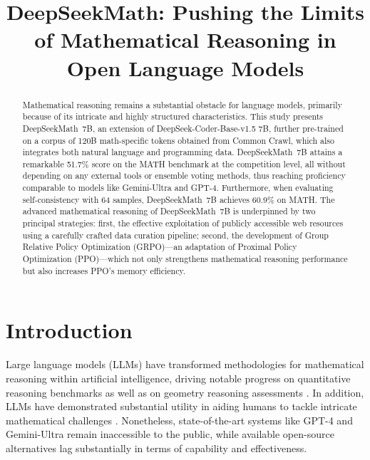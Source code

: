 \title{DeepSeekMath: Pushing the Limits of Mathematical Reasoning in Open Language Models}

\begin{abstract}
Mathematical reasoning remains a substantial obstacle for language models, primarily because of its intricate and highly structured characteristics. This study presents DeepSeekMath~7B, an extension of DeepSeek-Coder-Base-v1.5 7B, further pre-trained on a corpus of 120B math-specific tokens obtained from Common Crawl, which also integrates both natural language and programming data. DeepSeekMath~7B attains a remarkable 51.7\% score on the MATH benchmark at the competition level, all without depending on any external tools or ensemble voting methods, thus reaching proficiency comparable to models like Gemini-Ultra and GPT-4. Furthermore, when evaluating self-consistency with 64 samples, DeepSeekMath~7B achieves 60.9\% on MATH. The advanced mathematical reasoning of DeepSeekMath~7B is underpinned by two principal strategies: first, the effective exploitation of publicly accessible web resources using a carefully crafted data curation pipeline; second, the development of Group Relative Policy Optimization (GRPO)—an adaptation of Proximal Policy Optimization (PPO)—which not only strengthens mathematical reasoning performance but also increases PPO’s memory efficiency.
\end{abstract}

\section{Introduction}

Large language models (LLMs) have transformed methodologies for mathematical reasoning within artificial intelligence, driving notable progress on quantitative reasoning benchmarks \citep{MATH} as well as on geometry reasoning assessments \citep{trinh2024solving}. In addition, LLMs have demonstrated substantial utility in aiding humans to tackle intricate mathematical challenges \citep{tao}. Nonetheless, state-of-the-art systems like GPT-4 \citep{gpt4} and Gemini-Ultra \citep{gemini} remain inaccessible to the public, while available open-source alternatives lag substantially in terms of capability and effectiveness.

